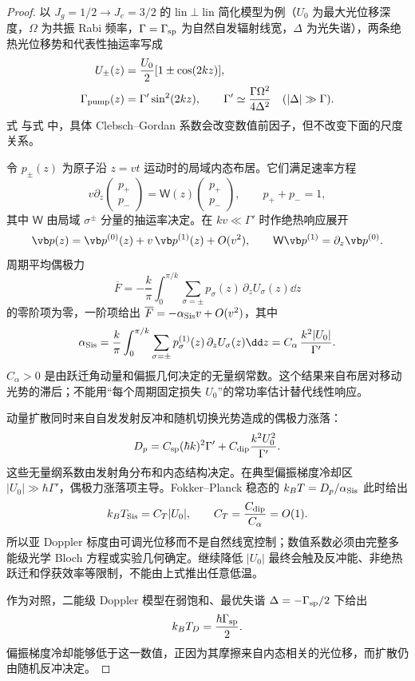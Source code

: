 \begin{proof}
以 \(J_g=1/2\to J_e=3/2\) 的 lin\(\perp\)lin 简化模型为例（\(U_0\) 为最大光位移深度，\(\Omega\) 为共振 Rabi 频率，\(\Gamma=\Gamma_{\rm sp}\) 为自然自发辐射线宽，\(\Delta\) 为光失谐），两条绝热光位移势和代表性抽运率写成
\begin{align}
 U_\pm(z)&=\frac{U_0}{2}[1\pm\cos(2kz)],
 \label{eq:sisyphus-light-shift}\\
 \Gamma_{\rm pump}(z)&=\Gamma'\sin^2(2kz),\qquad
 \Gamma'\simeq\frac{\Gamma\Omega^2}{4\Delta^2}
 \quad(|\Delta|\gg\Gamma).
 \label{eq:sisyphus-pump-rate}
\end{align}
式  与式  中，具体 Clebsch--Gordan 系数会改变数值前因子，但不改变下面的尺度关系。

令 \(p_\pm(z)\) 为原子沿 \(z=vt\) 运动时的局域内态布居。它们满足速率方程
\[
 v\partial_z
 \begin{pmatrix}p_+\\p_-\end{pmatrix}
 =\mathsf W(z)
 \begin{pmatrix}p_+\\p_-\end{pmatrix},
 \qquad p_++p_-=1,
\]
其中 \(\mathsf W\) 由局域 \(\sigma^\pm\) 分量的抽运率决定。在
\(kv\ll\Gamma'\) 时作绝热响应展开
\[
 \vb p(z)=\vb p^{(0)}(z)+v\,\vb p^{(1)}(z)+O(v^2),\qquad
 \mathsf W\vb p^{(1)}=\partial_z\vb p^{(0)} .
\]
周期平均偶极力
\[
 \overline F=-\frac{k}{\pi}\int_0^{\pi/k}
 \sum_{\sigma=\pm}p_\sigma(z)\,\partial_zU_\sigma(z)\dd z
\]
的零阶项为零，一阶项给出 \(\overline F=-\alpha_{\rm Sis}v+O(v^2)\)，其中
\begin{equation}
 \alpha_{\rm Sis}
 =\frac{k}{\pi}\int_0^{\pi/k}
 \sum_{\sigma=\pm}p_\sigma^{(1)}(z)\,\partial_zU_\sigma(z)\dd z
 =C_\alpha\,\frac{k^2|U_0|}{\Gamma'} .
 \label{eq:sisyphus-friction}
\end{equation}
\(C_\alpha>0\) 是由跃迁角动量和偏振几何决定的无量纲常数。这个结果来自布居对移动光势的滞后；不能用“每个周期固定损失 \(U_0\)”的常功率估计替代线性响应。

动量扩散同时来自自发发射反冲和随机切换光势造成的偶极力涨落：
\[
 D_p=C_{\rm sp}(\hbar k)^2\Gamma'
 +C_{\rm dip}\frac{k^2U_0^2}{\Gamma'}.
\]
这些无量纲系数由发射角分布和内态结构决定。在典型偏振梯度冷却区
\(|U_0|\gg\hbar\Gamma'\)，偶极力涨落项主导。Fokker--Planck 稳态的
\(k_BT=D_p/\alpha_{\rm Sis}\) 此时给出
\begin{equation}
 k_BT_{\rm Sis}=C_T|U_0|,\qquad
 C_T=\frac{C_{\rm dip}}{C_\alpha}=O(1).
 \label{eq:sisyphus-temperature}
\end{equation}
所以亚 Doppler 标度由可调光位移而不是自然线宽控制；数值系数必须由完整多能级光学 Bloch 方程或实验几何确定。继续降低 \(|U_0|\) 最终会触及反冲能、非绝热跃迁和俘获效率等限制，不能由上式推出任意低温。

作为对照，二能级 Doppler 模型在弱饱和、最优失谐
\(\Delta=-\Gamma_{\rm sp}/2\) 下给出
\begin{equation}
 k_BT_D=\frac{\hbar\Gamma_{\rm sp}}{2}.
 \label{eq:phys-lc-doppler-limit}
\end{equation}
偏振梯度冷却能够低于这一数值，正因为其摩擦来自内态相关的光位移，而扩散仍由随机反冲决定。
\end{proof}
